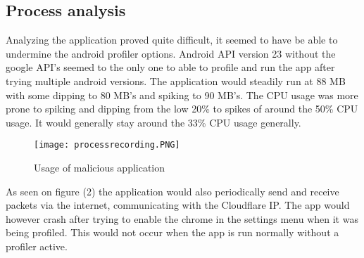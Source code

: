 \subsection{Process analysis}

Analyzing the application proved quite difficult, it seemed to have be able to undermine the android profiler options.  
Android API version 23 without the google API’s seemed to the only one to able to profile and run the app after trying multiple android versions. 
The application would steadily run at 88 MB with some dipping to 80 MB’s and spiking to 90 MB’s. 
The CPU usage was more prone to spiking and dipping from the low 20\% to spikes of around the 50\% CPU usage. 
It would generally stay around the 33\% CPU usage generally.

\begin{figure}[H]
    \texttt{[image: processrecording.PNG]}
    \caption{Usage of malicious application}
    \label{tim-process}
\end{figure}

As seen on figure (2) the application would also periodically send and receive packets via the internet, communicating with the Cloudflare IP. 
The app would however crash after trying to enable the chrome in the settings menu when it was being profiled. 
This would not occur when the app is run normally without a profiler active. 